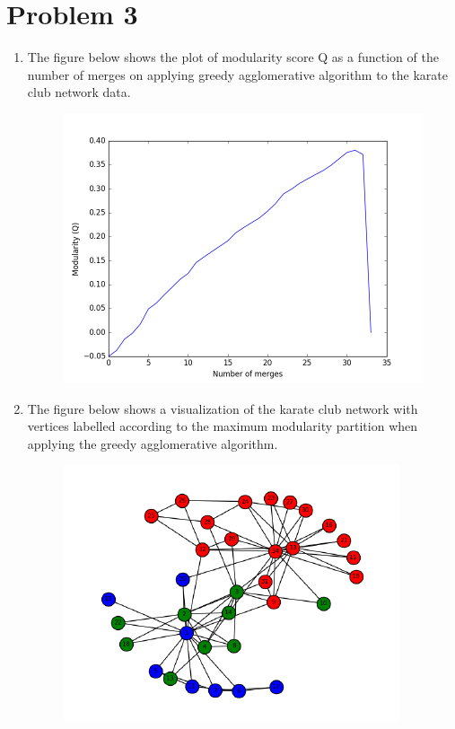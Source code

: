 \documentclass{article}
\begin{document}
\section*{Problem 3}
\begin{enumerate}[label=(\roman*)]
\item
The figure below shows the plot of modularity score Q as a function of the number of merges on applying greedy agglomerative algorithm to the karate club network data.

\begin{figure}[h]
  \centering
  \begin{minipage}[b]{0.6\textwidth}
    \includegraphics[width=\textwidth]{images/p3a.png}
  \end{minipage}
\end{figure}
 
\item
The figure below shows a visualization of the karate club network with vertices labelled according to the maximum modularity partition when applying the greedy agglomerative algorithm.
\begin{figure}[h]
  \centering
  \begin{minipage}[b]{0.7\textwidth}
    \includegraphics[width=\textwidth]{images/p3b.png}
  \end{minipage}
\end{figure}


\end{enumerate}
\end{document}
